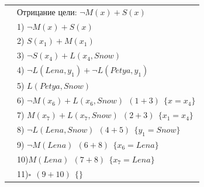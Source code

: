 \begin{table}[h!]
\begin{tabular}{|c|l|}
        & Отрицание цели: $\neg M(x) + S(x)$ \\
        & 1) $\neg M(x) + S(x)$ \\
        & 2) $S(x_1) + M(x_1)$ \\
        & 3) $\neg S(x_4) + L(x_4, Snow)$ \\
        & 4) $\neg L(Lena, y_1) + \neg L(Petya, y_1)$ \\
        & 5) $L(Petya, Snow)$ \\
        & 6) $\neg M(x_6) + L(x_6, Snow)~~(1 + 3)~~\{x=x_4\}$ \\
        & 7) $M(x_7) + L(x_7, Snow)~~(2 + 3)~~\{x_1=x_4\}$ \\
        & 8) $\neg L(Lena, Snow)~~(4 + 5)~~\{y_1=Snow\}$ \\
        & 9) $\neg M(Lena)~~(6 + 8)~~\{x_6=Lena\}$ \\
        & 10)$M(Lena)~~(7 + 8)~~\{x_7=Lena\}$ \\
        & 11)$\square~~(9 + 10)~~\{\}$ \\
        \hline
    \end{tabular}
\end{table}
